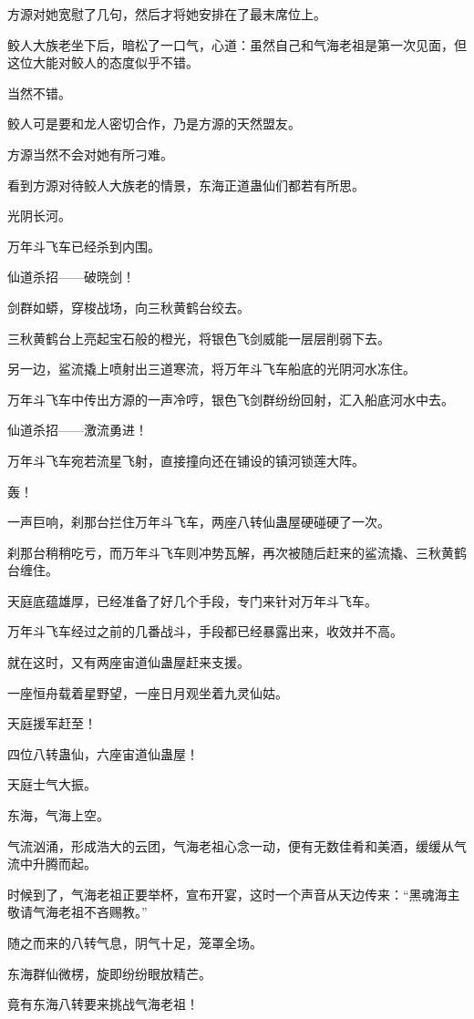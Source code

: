 \begin{this_body}
方源对她宽慰了几句，然后才将她安排在了最末席位上。

鲛人大族老坐下后，暗松了一口气，心道：虽然自己和气海老祖是第一次见面，但这位大能对鲛人的态度似乎不错。

当然不错。

鲛人可是要和龙人密切合作，乃是方源的天然盟友。

方源当然不会对她有所刁难。

看到方源对待鲛人大族老的情景，东海正道蛊仙们都若有所思。

光阴长河。

万年斗飞车已经杀到内围。

仙道杀招——破晓剑！

剑群如蟒，穿梭战场，向三秋黄鹤台绞去。

三秋黄鹤台上亮起宝石般的橙光，将银色飞剑威能一层层削弱下去。

另一边，鲨流撬上喷射出三道寒流，将万年斗飞车船底的光阴河水冻住。

万年斗飞车中传出方源的一声冷哼，银色飞剑群纷纷回射，汇入船底河水中去。

仙道杀招——激流勇进！

万年斗飞车宛若流星飞射，直接撞向还在铺设的镇河锁莲大阵。

轰！

一声巨响，刹那台拦住万年斗飞车，两座八转仙蛊屋硬碰硬了一次。

刹那台稍稍吃亏，而万年斗飞车则冲势瓦解，再次被随后赶来的鲨流撬、三秋黄鹤台缠住。

天庭底蕴雄厚，已经准备了好几个手段，专门来针对万年斗飞车。

万年斗飞车经过之前的几番战斗，手段都已经暴露出来，收效并不高。

就在这时，又有两座宙道仙蛊屋赶来支援。

一座恒舟载着星野望，一座日月观坐着九灵仙姑。

天庭援军赶至！

四位八转蛊仙，六座宙道仙蛊屋！

天庭士气大振。

东海，气海上空。

气流汹涌，形成浩大的云团，气海老祖心念一动，便有无数佳肴和美酒，缓缓从气流中升腾而起。

时候到了，气海老祖正要举杯，宣布开宴，这时一个声音从天边传来：“黑魂海主敬请气海老祖不吝赐教。”

随之而来的八转气息，阴气十足，笼罩全场。

东海群仙微楞，旋即纷纷眼放精芒。

竟有东海八转要来挑战气海老祖！

\end{this_body}

